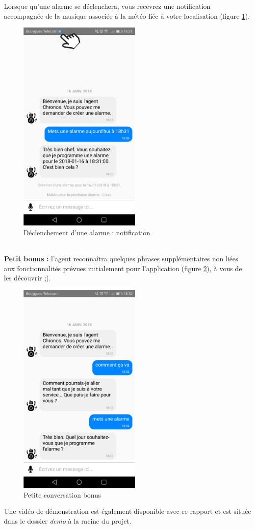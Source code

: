 Lorsque qu'une alarme se déclenchera, vous recevrez une notification accompagnée de la musique associée à la météo liée à votre localisation (figure \ref{H}).

\begin{figure}[H]
  \centering
  \includegraphics[width=6cm]{images/H.png}
  \caption{Déclenchement d'une alarme : notification}
  \label{H}
\end{figure}

~\\\indent
\textbf{Petit bonus :} l'agent reconnaîtra quelques phrases supplémentaires non liées aux fonctionnalités prévues initialement pour l'application (figure \ref{J}), à vous de les découvrir \textsf{;)}.

\begin{figure}[H]
  \centering
  \includegraphics[width=6cm]{images/J.png}
  \caption{Petite conversation bonus}
  \label{J}
\end{figure}

Une vidéo de démonstration est également disponible avec ce rapport et est située dans le dossier \emph{demo} à la racine du projet.\\
